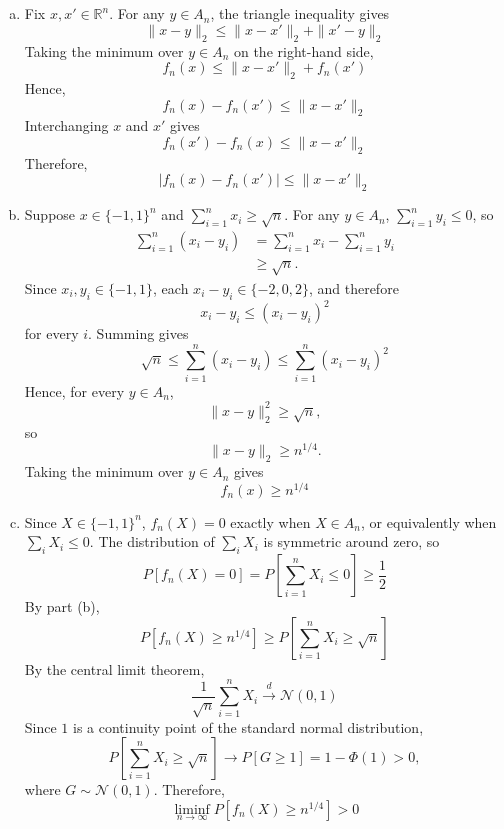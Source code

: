 \documentclass[11pt,a4paper,margin=1in]{article}
\begin{document}
\section{}
\begin{enumerate}[(a)]
    \item Fix $x,x'\in\mathbb R^n$. For any $y\in A_n$, the triangle inequality gives
    \[
        \|x-y\|_2\leq\|x-x'\|_2+\|x'-y\|_2
    \]
    Taking the minimum over $y\in A_n$ on the right-hand side,
    \[
        f_n(x)\leq\|x-x'\|_2+f_n(x')
    \]
    Hence,
    \[
        f_n(x)-f_n(x')\leq\|x-x'\|_2
    \]
    Interchanging $x$ and $x'$ gives
    \[
        f_n(x')-f_n(x)\leq\|x-x'\|_2
    \]
    Therefore,
    \[
        |f_n(x)-f_n(x')|\leq\|x-x'\|_2
    \]

    \item Suppose $x\in\{-1,1\}^n$ and $\sum_{i=1}^n x_i\geq\sqrt n$. For any 
    $y\in A_n$, $\sum_{i=1}^n y_i\leq0$, so
    \begin{align*}
        \sum_{i=1}^n(x_i-y_i) &=\sum_{i=1}^n x_i-\sum_{i=1}^n y_i \\
        &\geq\sqrt n.
    \end{align*}
    Since $x_i,y_i\in\{-1,1\}$, each $x_i-y_i\in\{-2,0,2\}$, and therefore
    \[
        x_i-y_i\leq(x_i-y_i)^2
    \]
    for every $i$. Summing gives
    \[
        \sqrt n\leq\sum_{i=1}^n(x_i-y_i)\leq\sum_{i=1}^n(x_i-y_i)^2
    \]
    Hence, for every $y\in A_n$,
    \[
        \|x-y\|_2^2\geq\sqrt n,
    \]
    so
    \[
        \|x-y\|_2\geq n^{1/4}.
    \]
    Taking the minimum over $y\in A_n$ gives
    \[
        f_n(x)\geq n^{1/4}
    \]

    \item Since $X\in\{-1,1\}^n$, $f_n(X)=0$ exactly when $X\in A_n$, or equivalently 
    when $\sum_iX_i\leq0$. The distribution of $\sum_iX_i$ is symmetric around zero, so
    \[
        P[f_n(X)=0] = P\left[\sum_{i=1}^nX_i\leq0\right]\geq\frac12
    \]
    By part (b),
    \[
        P[f_n(X)\geq n^{1/4}] \geq P\left[\sum_{i=1}^nX_i\geq\sqrt n\right]
    \]
    By the central limit theorem,
    \[
        \frac{1}{\sqrt n}\sum_{i=1}^nX_i\xrightarrow{d}\mathcal N(0,1)
    \]
    Since $1$ is a continuity point of the standard normal distribution,
    \[
        P\left[\sum_{i=1}^nX_i\geq\sqrt n\right]
        \longrightarrow P[G\geq1]=1-\Phi(1)>0,
    \]
    where $G\sim\mathcal N(0,1)$. Therefore,
    \[
        \liminf_{n\to\infty}P[f_n(X)\geq n^{1/4}]>0
    \]


\end{enumerate}
\end{document}
